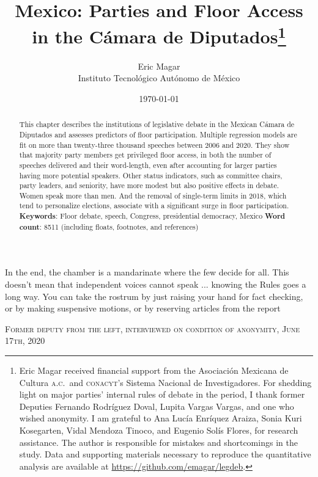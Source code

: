 \documentclass[letter,12pt]{article}
\begin{document}
\title{Mexico: Parties and Floor Access in the Cámara de Diputados\thanks{Eric Magar received financial support from the Asociaci\'on Mexicana de Cultura \textsc{a.c.}\ and \textsc{conacyt}'s Sistema Nacional de Investigadores. For shedding light on major parties' internal rules of debate in the period, I thank former Deputies Fernando Rodríguez Doval, Lupita Vargas Vargas, and one who wished anonymity. I am grateful to Ana Lucía Enríquez Araiza, Sonia Kuri Kosegarten, Vidal Mendoza Tinoco, and Eugenio Solís Flores, for research assistance. The author is responsible for mistakes and shortcomings in the study. Data and supporting materials necessary to reproduce the quantitative analysis are available at \url{https://github.com/emagar/legdeb}.}}
\author{Eric Magar \\ Instituto Tecnológico Autónomo de México}
\date{\today}
\maketitle




\begin{abstract}
\noindent This chapter describes the institutions of legislative debate in the Mexican Cámara de Diputados and assesses predictors of floor participation. Multiple regression models are fit on more than twenty-three thousand speeches between 2006 and 2020. They show that majority party members get privileged floor access, in both the number of speeches delivered and their word-length, even after accounting for larger parties having more potential speakers. Other status indicators, such as committee chairs, party leaders, and seniority, have more modest but also positive effects in debate. Women speak more than men. And the removal of single-term limits in 2018, which tend to personalize elections, associate with a significant surge in floor participation. 
\newline
\newline
\textbf{Keywords}: Floor debate, speech, Congress, presidential democracy, Mexico
\newline
\newline
\textbf{Word count}: 8511 (including floats, footnotes, and references)
\end{abstract}

\newpage

\singlespacing
\epigraph{In the end, the chamber is a mandarinate where the few decide for all. This doesn't mean that independent voices cannot speak ... knowing the Rules goes a long way. You can take the rostrum by just raising your hand for fact checking, or by making suspensive motions, or by reserving articles from the report}%
{\textsc{Former deputy from the left, interviewed on condition of anonymity, June 17th, 2020}}
\doublespacing
\end{document}
